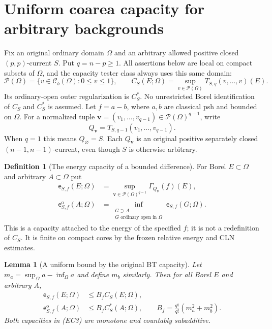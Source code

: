 \documentclass[11pt,a4paper]{article}
\numberwithin{equation}{section}
\newtheorem{lemma}[theorem]{Lemma}
\theoremstyle{definition}
\newtheorem{definition}[theorem]{Definition}
\theoremstyle{remark}
\begin{document}
\section{Uniform coarea capacity for arbitrary backgrounds}
\label{sec:r11-uniform-coarea-capacity}

Fix an original ordinary domain $\Omega$ and an arbitrary
allowed positive closed $(p,p)$-current $S$.  Put $q=n-p\ge1$.
All assertions below are local on compact subsets of $\Omega$,
and the capacity tester class always uses this same domain:
\[
 \mathcal P(\Omega)
  =\{v\in\mathcal C_b(\Omega):0\le v\le1\},
 \qquad
 C_S(E;\Omega)
  =\sup_{v\in\mathcal P(\Omega)}T_{S,q}(v,\ldots,v)(E).
 \tag{EC1}
\]
Its ordinary-open outer regularization is $C_S^*$.
No unrestricted Borel identification of $C_S$ and $C_S^*$
is assumed.  Let $f=a-b$, where $a,b$ are classical psh and
bounded on $\Omega$.  For a normalized tuple
$\mathbf v=(v_1,\ldots,v_{q-1})\in\mathcal P(\Omega)^{q-1}$,
write
\[
 Q_{\mathbf v}=T_{S,q-1}(v_1,\ldots,v_{q-1}).
 \tag{EC2}
\]
When $q=1$ this means $Q_{\varnothing}=S$.
Each $Q_{\mathbf v}$ is an original positive separately closed
$(n-1,n-1)$-current, even though $S$ is otherwise arbitrary.

\begin{definition}[The energy capacity of a bounded difference]
\label{def:r11-energy-layer-capacity}
For Borel $E\subset\Omega$ and arbitrary $A\subset\Omega$ put
\[
 \begin{split}
 \mathsf e_{S,f}(E;\Omega)
    &=\sup_{\mathbf v\in\mathcal P(\Omega)^{q-1}}
                          \Gamma_{Q_{\mathbf v}}(f)(E),\\
 \mathsf e_{S,f}^{\mathrm o}(A;\Omega)
    &=\inf_{\substack{G\supset A\\G\text{ ordinary open in }\Omega}}
                                      \mathsf e_{S,f}(G;\Omega).
 \end{split}
 \tag{EC3}
\]
This is a capacity attached to the energy of the specified $f$;
it is not a redefinition of $C_S$.  It is finite on compact
cores by the frozen relative energy and CLN estimates.
\end{definition}

\begin{lemma}[A uniform bound by the original BT capacity]
\label{lem:r11-energy-layer-BT-bound}
Let $m_a=\sup_\Omega a-\inf_\Omega a$ and define $m_b$
similarly.  Then for all Borel $E$ and arbitrary $A$,
\[
 \begin{split}
 \mathsf e_{S,f}(E;\Omega)&\le B_f C_S(E;\Omega),\\
 \mathsf e_{S,f}^{\mathrm o}(A;\Omega)&\le B_f C_S^*(A;\Omega),
 \qquad
 B_f=\frac{q^q}{q!}(m_a^2+m_b^2).
 \end{split}
 \tag{EC4}
\]
Both capacities in (EC3) are monotone and countably subadditive.
\end{lemma}
\end{document}
